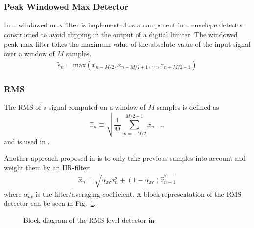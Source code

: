 \documentclass[../main2.tex]{subfiles}
\providecommand{\rootdir}{..}
\begin{document}
\subsubsection{Peak Windowed Max Detector}
In \cite{hamalainen2002smoothing} a windowed max filter is implemented as a component in a envelope detector constructed to avoid clipping in the output of a digital limiter. The windowed peak max filter takes the maximum value of the absolute value of the input signal over a window of $M$ samples.
\begin{align}\label{eq:window_max_det}
\tilde{e}_n = \text{max}(x_{n-M/2},x_{n-M/2+1},..., x_{n+M/2-1})
\end{align}

\subsubsection{RMS}
The RMS of a signal computed on a window of $M$ samples is defined as
\begin{equation}
\hat{x}_n \equiv \sqrt{ \frac{1}{M} \sum_{m=-M/2}^{M/2-1} x_{n-m}}
\end{equation}
and is used in \cite{reiss2010rev}\cite{bosi1991low}.

Another approach proposed in \cite{mcnally1984dynamic} is to only take previous samples into account and weight them by an IIR-filter:
\begin{align*}
\hat{x}_n = \sqrt{\alpha_{\text{av}} x_{n}^2+ (1-\alpha_{\text{av}}) \hat{x}_{n-1}^2}
\end{align*}
where $\alpha_{av}$ is the filter/averaging coefficient. A block representation of the RMS detector can be seen in Fig.~\ref{fig:block_mcnally_theory_rms}.%
\begin{figure}[h]
\centerline{}
\caption{Block diagram of the RMS level detector in \cite{mcnally1984dynamic}}
\label{fig:block_mcnally_theory_rms}
\end{figure}
\end{document}
